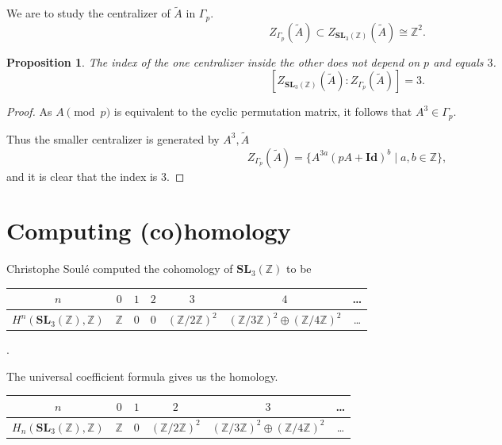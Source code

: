 \documentclass[a4paper]{article}
\newtheorem{Prop}[Thm]{Proposition}
\newcommand{\Id}{\mathbf{Id}}        %
\newcommand{\SL}{\mathbf{SL}_3(\mathbb{Z})}        %
\newcommand{\SLp}{\Gamma_p}        %
\begin{document}
We are to study the centralizer of $\tilde A$ in $\SLp$.
\[
Z_{\SLp}(\tilde A) \subset 
Z_{\SL}(\tilde A) \cong \mathbb{Z}^2
.\] 

\begin{Prop}
	The index of the one centralizer inside the other \emph{does not depend on $p$} and equals $3$.
\[
	[Z_{\SL}(\tilde A) : Z_{\SLp}(\tilde A) ] = 3
.\] 
\end{Prop}
\begin{proof}
As $A \pmod p$ is equivalent to the cyclic permutation matrix, it follows that $A^3 \in \SLp$.

Thus the smaller centralizer is generated by $A^3, \tilde A$
\[
Z_{\SLp}(\tilde A)
= \{ A^{3a} (p A + \Id)^b \mid a, b \in \mathbb{Z} \}
,\] 
and it is clear that the index is $3$.
\end{proof}

\newpage
\section{Computing (co)homology}
Christophe Soulé \cite{soule1978}
computed the cohomology of $\SL$
to be
\begin{table}[h!]
	\centering
\begin{tabular}{|c|c|c|c|c|c|c}
	\hline
	$n$        & $0$                               & $1$                               & $2$                               & $3$                               & $4$  & \ldots\\
\hline 
	$H^n(\SL, \mathbb{Z})$ & $\mathbb{Z}$ & $0$ & $0$ & $(\mathbb{Z}/2\mathbb{Z})^{2} $ & $(\mathbb{Z}/3\mathbb{Z})^{2} \oplus (\mathbb{Z}/4\mathbb{Z})^{2} $ & \ldots \\
\hline
\end{tabular}.
\end{table}

The universal coefficient formula gives us the homology.
\begin{table}[h!]
	\centering
\begin{tabular}{|c|c|c|c|c|c}
	\hline
	$n$        & $0$                               & $1$                               & $2$                               & $3$                               & \ldots\\
\hline 
	$H_n(\SL, \mathbb{Z})$ & $\mathbb{Z}$ & $0$ &  $(\mathbb{Z}/2\mathbb{Z})^{2} $ & $(\mathbb{Z}/3\mathbb{Z})^{2} \oplus (\mathbb{Z}/4\mathbb{Z})^{2} $ & \ldots \\
\hline
\end{tabular}
\end{table}
\end{document}
